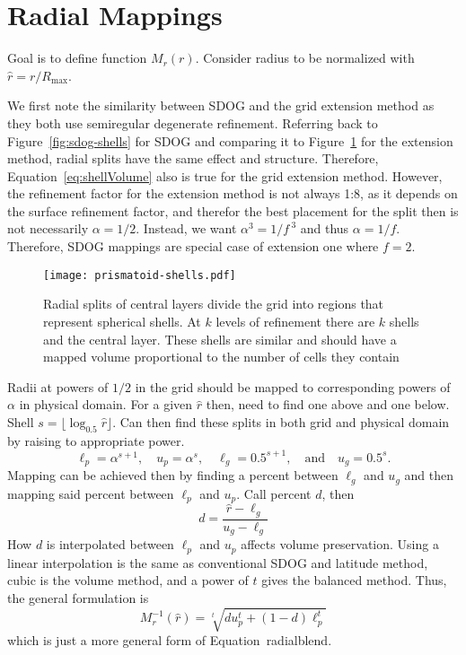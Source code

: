 \section{Radial Mappings} \label{chap:6:radial}
Goal is to define function $M_r(r)$. Consider radius to be normalized with $\hat{r} = r / R_\mathrm{max}$.


We first note the similarity between SDOG and the grid extension method as they both use semiregular degenerate refinement.
Referring back to Figure~\ref{fig:sdog-shells} for SDOG and comparing it to Figure~\ref{fig:prismatoid-shells} for the extension method, radial splits have the same effect and structure.
Therefore, Equation~\ref{eq:shellVolume} also is true for the grid extension method.
However, the refinement factor for the extension method is not always 1:8, as it depends on the surface refinement factor, and therefor the best placement for the split then is not necessarily $\alpha = 1/2$.
Instead, we want $\alpha^3 = 1 / f^{\ 3}$ and thus $\alpha = 1/f$.
Therefore, SDOG mappings are special case of extension one where $f = 2$.


\begin{figure}[ht!]
	\centering
	\texttt{[image: prismatoid-shells.pdf]}
	\caption[Spherical shells that result from the grid extension method]{
		Radial splits of central layers divide the grid into regions that represent spherical shells.
		At $k$ levels of refinement there are $k$ shells and the central layer.
		These shells are similar and should have a mapped volume proportional to the number of cells they contain
	}
	\label{fig:prismatoid-shells}
\end{figure}


Radii at powers of $1/2$ in the grid should be mapped to corresponding powers of $\alpha$ in physical domain.
For a given $\hat{r}$ then, need to find one above and one below.
Shell $s = \lfloor \log_{0.5} \hat{r} \rfloor$.
Can then find these splits in both grid and physical domain by raising to appropriate power.
%
\begin{equation*}
\ell_p = \alpha^{s + 1}, \quad u_p = \alpha^s, \quad \ell_g = 0.5^{s + 1}, \quad \text{and} \quad u_g = 0.5^s.
\end{equation*}
%
Mapping can be achieved then by finding a percent between $\ell_g$ and $u_g$ and then mapping said percent between $\ell_p$ and $u_p$.
Call percent $d$, then
%
\begin{equation} \label{eq:radialInvD}
d = \frac{ \hat{r} - \ell_g }{ u_g - \ell_g }
\end{equation}
%
How $d$ is interpolated between $\ell_p$ and $u_p$ affects volume preservation.
Using a linear interpolation is the same as conventional SDOG and latitude method, cubic is the volume method, and a power of $t$ gives the balanced method.
Thus, the general formulation is
%
\begin{equation} \label{eq:radialInv}
M_r^{-1}(\hat{r}) = \sqrt[t]{ d u_p^{t} + \left( 1 - d \right) \ell_p^{t} }
\end{equation}
%
which is just a more general form of Equation~radialblend.


